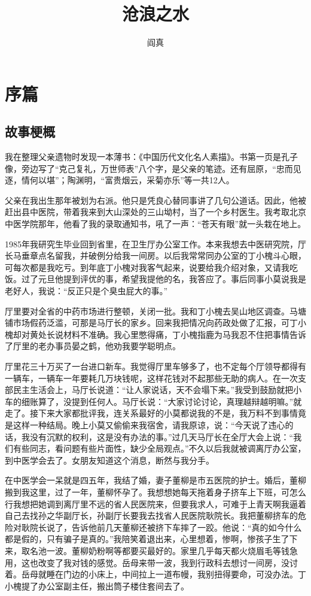 \documentclass[12pt,oneside]{book}
\title{沧浪之水}
\author{阎真}
\begin{document}

\frontmatter


\setcounter{tocdepth}{2}    
\tableofcontents

\mainmatter
\part{序篇}
\chapter{故事梗概}
我在整理父亲遗物时发现一本薄书：《中国历代文化名人素描》。书第一页是孔子像，旁边写了``克己复礼，万世师表''八个字，是父亲的笔迹。还有屈原，``忠而见逐，情何以堪''；陶渊明，``富贵烟云，采菊亦乐''等一共12人。

父亲在我出生那年被划为右派。他只是凭良心替同事讲了几句公道话。因此，他被赶出县中医院，带着我来到大山深处的三山坳村，当了一个乡村医生。我考取北京中医学院那年，他看了我的录取通知书，吼了一声：``苍天有眼''就一头栽在地上。

1985年我研究生毕业回到省里，在卫生厅办公室工作。本来我想去中医研究院，厅长马垂章点名留我，并破例分给我一间房。以后我常常同办公室的丁小槐斗心眼，可每次都是我吃亏。到年底丁小槐对我客气起来，说要给我介绍对象，又请我吃饭。过了元旦他提到评优的事，希望我提他的名，我答应了。事后同事小莫说我是老好人，我说：``反正只是个臭虫屁大的事。''

厅里要对全省的中药市场进行整顿，关闭一批。我和丁小槐去吴山地区调查。马塘铺市场假药泛滥，可那是马厅长的家乡。回来我把情况向药政处做了汇报，可丁小槐却对黄处长说材料不准确。我心里憋得痛，丁小槐指鹿为马我忍不住把事情告诉了厅里的老办事员晏之鹤，他劝我要学聪明点。

厅里花三十万买了一台进口新车。我觉得厅里车够多了，也不定每个厅领导都得有一辆车，一辆车一年要耗几万块钱呢，这样花钱对不起那些无助的病人。在一次支部民主生活会上，马厅长说道：``让人家说话，天不会塌下来。''我受到鼓励就把小车的细账算了，没提到任何人。马厅长说：``大家讨论讨论，真理越辩越明嘛。''就走了。接下来大家都批评我，连关系最好的小莫都说我的不是，我万料不到事情竟是这样一种结局。晚上小莫又偷偷来我宿舍，请我原谅，说：``今天说了违心的话，我没有沉默的权利，这是没有办法的事。''过几天马厅长在全厅大会上说：``我们有些同志，看问题有些片面性，缺少全局观点。''不久以后我就被调离厅办公室，到中医学会去了。女朋友知道这个消息，断然与我分手。

在中医学会一呆就是四五年，我结了婚，妻子董柳是市五医院的护士。婚后，董柳搬到我这里，过了一年，董柳怀孕了。我想想她每天拖着身子挤车上下班，可怎么行我想把她调到离厅里不远的省人民医院来，但要我求人，可难于上青天啊我逼着自己去找孙之华副厅长，孙副厅长要我去找省人民医院耿院长。我把董柳挤车的危险对耿院长说了，告诉他前几天董柳还被挤下车摔了一跤。他说：``真的如今什么都是假的，只有骗子是真的。''我陪笑着退出来，心里想着，惨啊，惨孩子生了下来，取名池一波。董柳奶粉啊等都要买最好的。家里几乎每天都火烧眉毛等钱急用，这也改变了我对钱的感觉。岳母来带一波，我到行政科去想讨一间房，没讨着。岳母就睡在门边的小床上，中间拉上一道布幔，我别扭得要命，可没办法。丁小槐提了办公室副主任，搬出筒子楼住套间去了。
\end{document}
